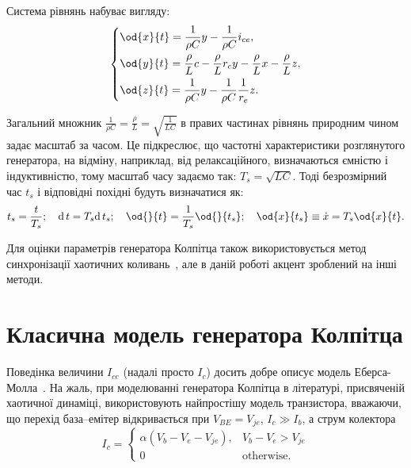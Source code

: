 Система рівнянь набуває вигляду:
%
\begin{equation}
\label{atu:eq:colp_phys2}
\begin{dcases}
  \od{x}{t}  = \dfrac{1}{\rho C}  y - \dfrac{1}{\rho C} i_{ce} , \\
  \od{y}{t}  = \dfrac{\rho}{L} c    - \dfrac{\rho}{L} r_c y - \dfrac{\rho}{L} x- \dfrac{\rho}{L} z, \\
  \od{z}{t}  = \dfrac{1}{\rho C}  y - \dfrac{1}{\rho C} \dfrac{1}{r_e} z.
\end{dcases}
\end{equation}

Загальний множник
$\frac{1}{\rho C} = \frac{\rho}{L} = \sqrt{\frac{1}{LC}} $ в правих частинах рівнянь
природним чином задає масштаб за часом. Це підкреслює,
що частотні характеристики розглянутого генератора, на
відміну, наприклад, від релаксаційного, визначаються ємністю і
індуктивністю, тому масштаб часу задаємо так:
$T_s = \sqrt{L C} $. Тоді безрозмірний час
$t_s $ і відповідні похідні будуть визначатися як:
%
\[
  t_s = \frac{t}{T_s}; \quad
  \mathrm{d}\, t = T_s \mathrm{d}\, t_s; \quad
  \od{}{t}  = \frac{1}{T_s} \od{}{t_s}; \quad
  \od{x}{t_s} \equiv \dot{x} = T_s \od{x}{t} .
\]

Для оцінки параметрів генератора Колпітца також
використовується метод синхронізації хаотичних
коливань~\cite{PhysRevE.80.016201,picovskii_syncro,bonetti_super_persistent_colpitts}, але в даній
роботі акцент зроблений на інші методи.


\section{Класична модель генератора Колпітца}  %

Поведінка величини
$I_{ce} $ (надалі просто
$I_c $) досить добре описує модель Еберса-Молла~\cite{horowitz}. На жаль,
при моделюванні генератора Колпітца в літературі, присвяченій
хаотичної динаміці, використовують найпростішу модель
транзистора, вважаючи, що перехід база--емітер відкривається при
$V_{BE} = V_{je} $,
$I_c \gg I_b $, а струм колектора
%
\begin{equation}
I_c =
  \begin{cases}
    \alpha ( V_b - V_e - V_{je} ), & V_b - V_e > V_{je} \\
    0                              & \text{otherwise}.
  \end{cases}
  \label{atu:eq:bjt_libear_model}
\end{equation}



